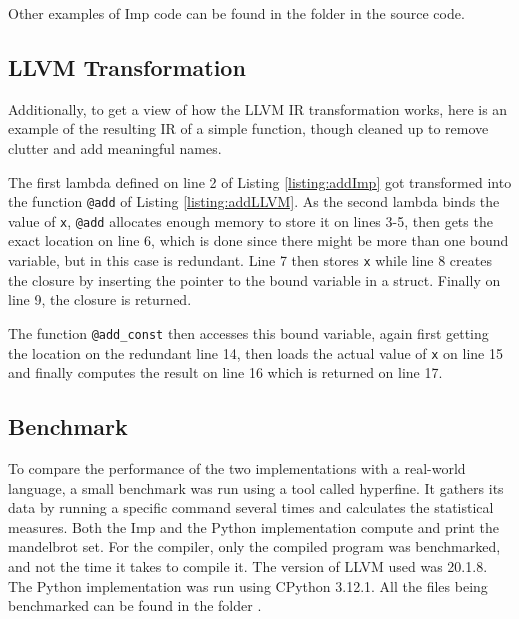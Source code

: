\documentclass[12pt]{article}
\begin{document}
Other examples of Imp code can be found in the folder  in
the source code.

\subsection{LLVM Transformation}

Additionally, to get a view of how the LLVM IR transformation works, here is
an example of the resulting IR of a simple function,
though cleaned up to remove clutter and add meaningful names.

\begin{minipage}{\linewidth}
	
	
\end{minipage}

The first lambda defined on line 2 of Listing \ref{listing:addImp} got transformed
into the function \texttt{@add} of Listing \ref{listing:addLLVM}.
As the second lambda binds the value of \texttt{x}, \texttt{@add} allocates
enough memory to store it on lines 3-5, then gets the exact location on line 6, which
is done since there might be more than one bound variable, but in this case is redundant.
Line 7 then stores \texttt{x} while line 8 creates the closure by inserting the pointer to the bound
variable in a struct.
Finally on line 9, the closure is returned.

The function \texttt{@add\_const} then accesses this bound variable, again first getting the
location on the redundant line 14, then loads the actual value of \texttt{x} on line 15
and finally computes the result on line 16 which is returned on line 17.

\subsection{Benchmark}

To compare the performance of the two implementations with a real-world language,
a small benchmark was run using a tool called hyperfine\autocite{peterHyperfine2023}.
It gathers its data by running a specific command several times and calculates
the statistical measures.
Both the Imp and the Python implementation compute and print the mandelbrot set.
For the compiler, only the compiled program was benchmarked, and not
the time it takes to compile it. The version of LLVM used was 20.1.8.
The Python implementation was run using CPython 3.12.1.
All the files being benchmarked can be found in the folder .
\end{document}

